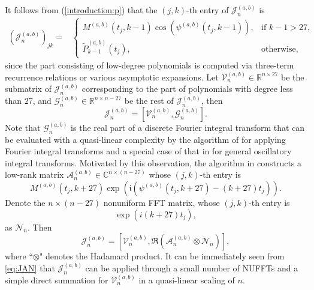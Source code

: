 \documentclass[11pt]{article}
\newcommand{\ii}{\mathfrak{i}}
\begin{document}
It follows from (\ref{introduction:p}) 
 that the $(j,k)$-th entry of $\mathcal{J}_n^{(a,b)}$ 
is
\begin{align}
\label{tf:jn} 
 \left(\mathcal{J}_n^{(a,b)} \right)_{jk}=& \begin{cases}
   M^{(a,b)}(t_j,k-1) \cos\left( \psi^{(a,b)}(t_j,k-1) \right),
& \text{if } k-1>27, \\
   \tilde{P}_{k-1}^{(a,b)}  (t_j),      & \text{otherwise,}
  \end{cases}
\end{align}
since the part consisting of low-degree polynomials is computed via three-term recurrence relations or various asymptotic expansions. Let $\mathcal{V}_n^{(a,b)}\in\mathbb{R}^{n\times 27}$ be the submatrix of $\mathcal{J}_n^{(a,b)}$ corresponding to the part of polynomials with degree less than $27$, and $\mathcal{G}_n^{(a,b)}\in\mathbb{R}^{n\times n-27}$ be the rest of $\mathcal{J}_n^{(a,b)}$, then 
\[
\mathcal{J}_n^{(a,b)} = \left[ \mathcal{V}_n^{(a,b)},\mathcal{G}_n^{(a,b)} \right].
\] 
Note that $\mathcal{G}_n^{(a,b)} $ is the real part of a discrete Fourier integral transform that can be evaluated with a quasi-linear complexity by the algorithm of \cite{Candes-Demanet-Ying} for applying Fourier integral transforms and a special case of that in \cite{yang2018unified} for general oscillatory integral transforms. Motivated by this observation, the algorithm in \cite{Jacobi} constructs a low-rank matrix $\mathcal{A}_{n}^{(a,b)}\in\mathbb{C}^{n \times (n-27)}$ whose $(j,k)$-th  entry is 
\begin{equation}
 M^{(a,b)}(t_j, k+27)\exp\left( \ii\left(\psi^{(a,b)} (t_j, k+27) - (k+27) t_j\right) \right).
\label{introduction:matrix}
\end{equation}
Denote the  $n \times (n-27)$ nonuniform FFT matrix, whose $(j,k)$-th entry is 
\begin{equation}
\exp\left( i (k+27) t_j\right),
\label{introduction:nufft}
\end{equation}
as $\mathcal{N}_{n}$. 
Then 
\begin{equation}
\label{eq:JAN}
\mathcal{J}_{n}^{(a,b)} = \left[ \mathcal{V}_n^{(a,b)},\Re{(\mathcal{A}_{n}^{(a,b)}\otimes \mathcal{N}_{n})}\right],
\end{equation}
where ``$\otimes$" denotes the Hadamard product. 
It can be immediately seen from \eqref{eq:JAN} that $\mathcal{J}_{n}^{(a,b)}$ can be applied through a small number of 
NUFFTs \cite{Greengard,Townsend} and a simple direct summation for $ \mathcal{V}_n^{(a,b)}$ in a quasi-linear scaling of $n$.
\end{document}

